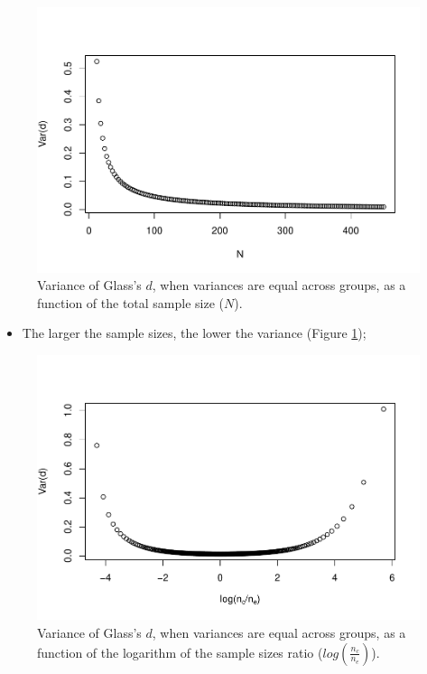 \documentclass[
  english,
  man,mask]{apa6}
\providecommand{\tightlist}{%
  \setlength{\itemsep}{0pt}\setlength{\parskip}{0pt}}
\begin{document}
\begin{figure}
\centering
\includegraphics{SupMat1_files/figure-latex/varglassNsize2-1.pdf}
\caption{\label{fig:varglassNsize2}Variance of Glass's \(d\), when variances are equal across groups, as a function of the total sample size (\(N\)).}
\end{figure}

\begin{itemize}
\tightlist
\item
  The larger the sample sizes, the lower the variance (Figure \ref{fig:varglassNsize2});
\end{itemize}

\begin{figure}
\centering
\includegraphics{SupMat1_files/figure-latex/varglasshomNratio2-1.pdf}
\caption{\label{fig:varglasshomNratio2}Variance of Glass's \(d\), when variances are equal across groups, as a function of the logarithm of the sample sizes ratio (\(log\left(\frac{n_c}{n_e} \right)\)).}
\end{figure}
\end{document}
